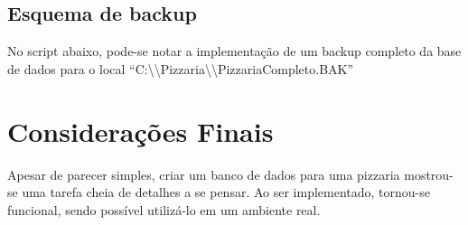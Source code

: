 \documentclass[
	12pt,				%
	openright,			%
	oneside,			%
	a4paper,			%
	chapter=TITLE,		%
	section=TITLE,		%
	english,			%
	brazil				%
	]{abntex2}
\begin{document}
\section{Esquema de backup}

No script abaixo, pode-se notar a implementação de um backup completo da base de dados para o local 
``C:\textbackslash \textbackslash Pizzaria\textbackslash \textbackslash PizzariaCompleto.BAK''



\chapter*[Considerações]{Considerações Finais}

Apesar de parecer simples, criar um banco de dados para uma pizzaria mostrou-se 
uma tarefa cheia de detalhes a se pensar. Ao ser implementado, tornou-se 
funcional, sendo possível utilizá-lo em um ambiente real.

\postextual

% 


%
%




\end{document}
